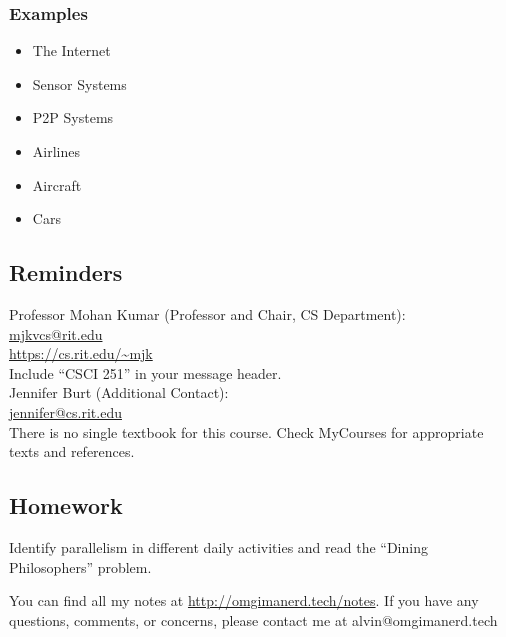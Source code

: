 \documentclass{math}
\begin{document}
\subsubsection*{Examples}
\begin{itemize}
  \item The Internet
  \item Sensor Systems
  \item P2P Systems
  \item Airlines
  \item Aircraft
  \item Cars
\end{itemize}

\subsection*{Reminders}
Professor Mohan Kumar (Professor and Chair, CS Department): \\
\url{mjkvcs@rit.edu} \\
\url{https://cs.rit.edu/~mjk} \\
Include ``CSCI 251'' in your message header. \\

\noindent Jennifer Burt (Additional Contact): \\
\url{jennifer@cs.rit.edu} \\

There is no single textbook for this course. Check MyCourses for appropriate
texts and references.

\subsection*{Homework}
Identify parallelism in different daily activities and read the
``Dining Philosophers'' problem.

\begin{center}
  You can find all my notes at \url{http://omgimanerd.tech/notes}. If you have
  any questions, comments, or concerns, please contact me at
  alvin@omgimanerd.tech
\end{center}
\end{document}
